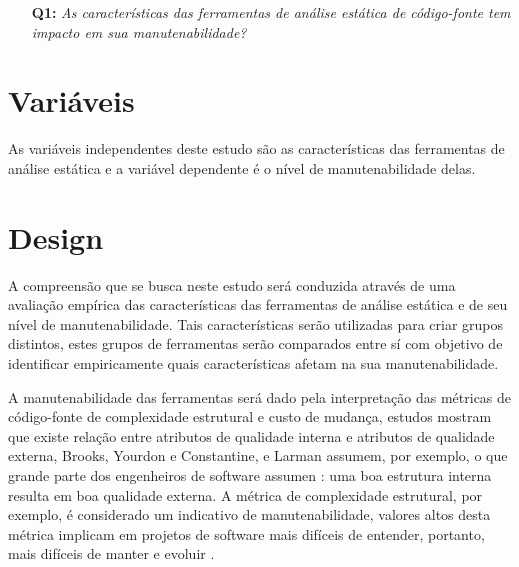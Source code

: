 \begin{enumerate}
  \item [{\bf Q1:}] {\em As características das ferramentas de análise estática
  de código-fonte tem impacto em sua manutenabilidade?}
\end{enumerate}

\section{Variáveis}

As variáveis independentes deste estudo são as características das ferramentas
de análise estática e a variável dependente é o nível de manutenabilidade
delas.

\section{Design}

A compreensão que se busca neste estudo será conduzida através de uma avaliação
empírica das características das ferramentas de análise estática e de seu nível
de manutenabilidade. Tais características serão utilizadas para criar grupos
distintos, estes grupos de ferramentas serão comparados entre sí com objetivo
de identificar empiricamente quais características afetam na sua
manutenabilidade.

A manutenabilidade das ferramentas será dado pela interpretação das métricas de
código-fonte de complexidade estrutural e custo de mudança, estudos mostram que
existe relação entre atributos de qualidade interna e atributos de qualidade
externa, Brooks, Yourdon e Constantine, e Larman assumem, por exemplo, o que grande parte dos
engenheiros de software assumen \cite{Fenton2014}: uma boa estrutura interna
resulta em boa qualidade externa. A métrica de complexidade estrutural, por
exemplo, é considerado um indicativo de manutenabilidade, valores altos desta métrica
implicam em projetos de software mais difíceis de entender, portanto, mais
difíceis de manter e evoluir \cite{Darcy2005}.

%
%

